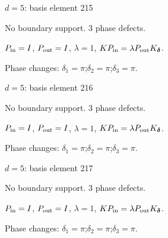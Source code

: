 \vfill
{\footnotesize\texttt{}}
\newpage
{}
{\Large $d=5$: basis element 215}\par
No boundary support. 3 phase defects.
\begin{center}
\end{center}
\vspace{-1mm}
$P_{\rm in}=I$, \quad $P_{\rm out}=I$, \quad $\lambda=1$, \qquad $K P_{\rm in}=\lambda P_{\rm out}K_{\boldsymbol\delta}$.
\par\smallskip\begin{minipage}{.98\linewidth}\small Phase changes: $\delta_{1}=\pi$;\quad $\delta_{2}=\pi$;\quad $\delta_{3}=\pi$.\end{minipage}
\vfill
{\footnotesize\texttt{}}
\newpage
{}
{\Large $d=5$: basis element 216}\par
No boundary support. 3 phase defects.
\begin{center}
\end{center}
\vspace{-1mm}
$P_{\rm in}=I$, \quad $P_{\rm out}=I$, \quad $\lambda=1$, \qquad $K P_{\rm in}=\lambda P_{\rm out}K_{\boldsymbol\delta}$.
\par\smallskip\begin{minipage}{.98\linewidth}\small Phase changes: $\delta_{1}=\pi$;\quad $\delta_{2}=\pi$;\quad $\delta_{3}=\pi$.\end{minipage}
\vfill
{\footnotesize\texttt{}}
\newpage
{}
{\Large $d=5$: basis element 217}\par
No boundary support. 3 phase defects.
\begin{center}
\end{center}
\vspace{-1mm}
$P_{\rm in}=I$, \quad $P_{\rm out}=I$, \quad $\lambda=1$, \qquad $K P_{\rm in}=\lambda P_{\rm out}K_{\boldsymbol\delta}$.
\par\smallskip\begin{minipage}{.98\linewidth}\small Phase changes: $\delta_{1}=\pi$;\quad $\delta_{2}=\pi$;\quad $\delta_{3}=\pi$.\end{minipage}
\vfill
{\footnotesize\texttt{}}
\newpage
{}
